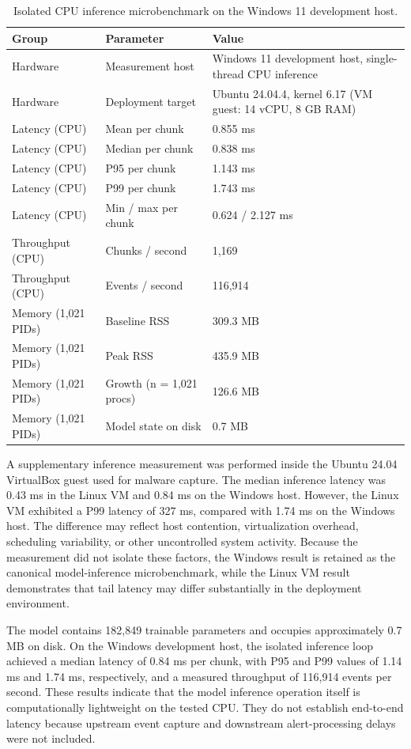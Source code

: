 \begin{table}[htbp]
\centering
\small
\caption{Isolated CPU inference microbenchmark on the Windows 11 development host.}\label{tab:4-10}
\begin{tabularx}{\textwidth}{llX}
\hline
\textbf{Group} & \textbf{Parameter} & \textbf{Value} \\
\hline
Hardware & Measurement host & Windows 11 development host, single-thread CPU inference \\
Hardware & Deployment target & Ubuntu 24.04.4, kernel 6.17 (VM guest: 14 vCPU, 8 GB RAM) \\
Latency (CPU) & Mean per chunk & 0.855 ms \\
Latency (CPU) & Median per chunk & 0.838 ms \\
Latency (CPU) & P95 per chunk & 1.143 ms \\
Latency (CPU) & P99 per chunk & 1.743 ms \\
Latency (CPU) & Min /\allowbreak{} max per chunk & 0.624 /\allowbreak{} 2.127 ms \\
Throughput (CPU) & Chunks /\allowbreak{} second & 1,169 \\
Throughput (CPU) & Events /\allowbreak{} second & 116,914 \\
Memory (1,021 PIDs) & Baseline RSS & 309.3 MB \\
Memory (1,021 PIDs) & Peak RSS & 435.9 MB \\
Memory (1,021 PIDs) & Growth (n = 1,021 procs) & 126.6 MB \\
Memory (1,021 PIDs) & Model state on disk & 0.7 MB \\
\hline
\end{tabularx}
\end{table}

A supplementary inference measurement was performed inside the Ubuntu 24.04 VirtualBox guest used for malware capture. The median inference latency was 0.43 ms in the Linux VM and 0.84 ms on the Windows host. However, the Linux VM exhibited a P99 latency of 327 ms, compared with 1.74 ms on the Windows host. The difference may reflect host contention, virtualization overhead, scheduling variability, or other uncontrolled system activity. Because the measurement did not isolate these factors, the Windows result is retained as the canonical model-inference microbenchmark, while the Linux VM result demonstrates that tail latency may differ substantially in the deployment environment.

The model contains 182,849 trainable parameters and occupies approximately 0.7 MB on disk. On the Windows development host, the isolated inference loop achieved a median latency of 0.84 ms per chunk, with P95 and P99 values of 1.14 ms and 1.74 ms, respectively, and a measured throughput of 116,914 events per second. These results indicate that the model inference operation itself is computationally lightweight on the tested CPU. They do not establish end-to-end latency because upstream event capture and downstream alert-processing delays were not included.

